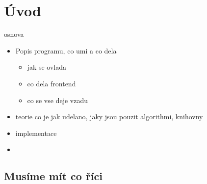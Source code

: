 
\chapter{Úvod}
osnova
\begin{itemize}
\item Popis programu, co umi a co dela
\begin{itemize}
	\item jak se ovlada
	\item co dela frontend
	\item co se vse deje vzadu
\end{itemize}
\item teorie co je jak udelano, jaky jsou pouzit algorithmi, knihovny
\item implementace\cite{oglDev}\cite{OpenGLBookcz}
	
\item  
\end{itemize}

\section{Musíme mít co říci}



